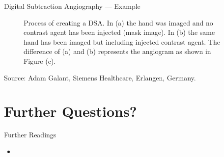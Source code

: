 \begin{frame}[c]{Digital Subtraction Angiography --- Example}
\begin{figure}[tb]
        \caption{Process of creating a DSA. In (a) the hand was imaged and no contrast agent has been injected (mask image). In (b) the same hand has been imaged but including injected contrast agent. The difference of (a) and (b) represents the angiogram as shown in Figure (c).}\label{fig_chap:xray_dsa}
    \end{figure}
    \begin{flushright}
        \tiny Source: Adam Galant, Siemens Healthcare, Erlangen, Germany.
    \end{flushright}
\end{frame}



\section{Further Questions?}

\begin{frame}[t]{Further Readings}
    \begin{itemize}
        \item {}
    \end{itemize}

\end{frame}


